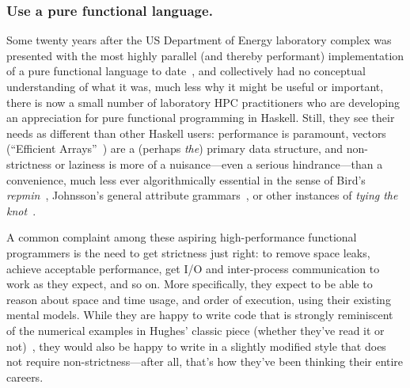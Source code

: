 \documentclass{llncs}
\begin{document}
\subsubsection{Use a pure functional language.}
Some twenty years after the US Department of Energy laboratory complex was
presented with the most highly parallel (and thereby performant)
implementation of a pure functional language to date~\cite{Davis96}, and
collectively had no conceptual understanding of what it was, much less why it
might be useful or important, there is now a small number of laboratory HPC
practitioners who are developing an appreciation for pure functional
programming in Haskell.  Still, they see their needs as different than other
Haskell users: performance is paramount, vectors (``Efficient
Arrays''~\cite{vector}) are a (perhaps \emph{the}) primary data structure, and
non-strictness or laziness is more of a nuisance---even a serious
hindrance---than a convenience, much less ever algorithmically essential in
the sense of Bird's \emph{repmin}~\cite{Bird84}, Johnsson's general attribute
grammars~\cite{Johnsson87}, or other instances of \emph{tying the
  knot}~\cite{tying-the-knot}.

A common complaint among these aspiring high-performance functional
programmers is the need to get strictness just right: to remove space leaks,
achieve acceptable performance, get I/O and inter-process communication to work
as they expect, and so on.  More specifically, they expect to be able to
reason about space and time usage, and order of execution, using their
existing mental models. While they are happy to write code that is strongly
reminiscent of the numerical examples in Hughes' classic piece (whether
they've read it or not)~\cite{Hughes89}, they would also be happy to write in
a slightly modified style that does not require non-strictness---after all,
that's how they've been thinking their entire careers.
\end{document}
